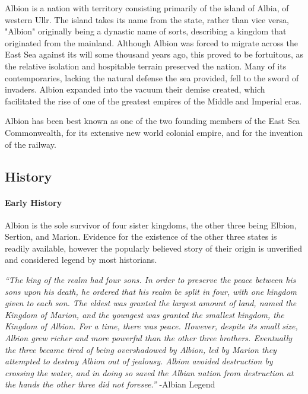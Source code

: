 

	Albion is a nation with territory consisting primarily of the island of Albia, of western Ullr.  The island takes its name from the state, rather than vice versa, "Albion" originally being a dynastic name of sorts, describing a kingdom that originated from the mainland.  Although Albion was forced to migrate across the East Sea against its will some thousand years ago, this proved to be fortuitous, as the relative isolation and hospitable terrain preserved the nation.  Many of its contemporaries, lacking the natural defense the sea provided, fell to the sword of invaders.  Albion expanded into the vacuum their demise created, which facilitated the rise of one of the greatest empires of the Middle and Imperial eras.

	Albion has been best known as one of the two founding members of the East Sea Commonwealth, for its extensive new world colonial empire, and for the invention of the railway.
	
\subsection{History} 
	
	\paragraph{Early History}
	Albion is the sole survivor of four sister kingdoms, the other three being Elbion, Sertion, and Marion.  Evidence for the existence of the other three states is readily available, however the popularly believed story of their origin is unverified and considered legend by most historians.

	\textit{``The king of the realm had four sons.  In order to preserve the peace between his sons upon his death, he ordered that his realm be split in four, with one kingdom given to each son.  The eldest was granted the largest amount of land, named the Kingdom of Marion, and the youngest was granted the smallest kingdom, the Kingdom of Albion.  For a time, there was peace.  However, despite its small size, Albion grew richer and more powerful than the other three brothers.  Eventually the three became tired of being overshadowed by Albion, led by Marion they attempted to destroy Albion out of jealousy.  Albion avoided destruction by crossing the water, and in doing so saved the Albian nation from destruction at the hands the other three did not foresee.''} -Albian Legend

